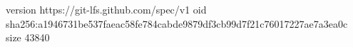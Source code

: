 version https://git-lfs.github.com/spec/v1
oid sha256:a1946731be537faeac58fe784cabde9879df3cb99d7f21c76017227ae7a3ea0c
size 43840

